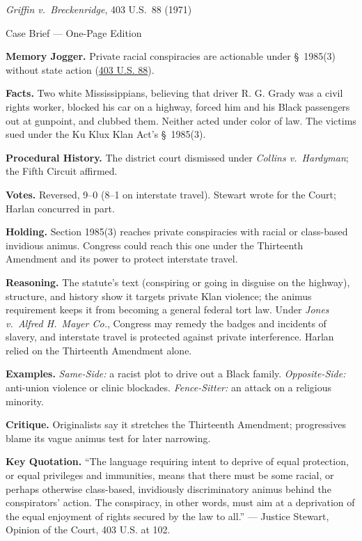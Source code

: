 \documentclass[12pt]{article}
\begin{document}
\begin{center}
{\Large \textit{Griffin v.\ Breckenridge}, 403 U.S.\ 88 (1971)\par}
\vspace{0.3em}
{\normalsize Case Brief --- One-Page Edition\par}
\end{center}

\textbf{Memory Jogger.} Private racial conspiracies are actionable under \S~1985(3) without state action (\href{https://supreme.justia.com/cases/federal/us/403/88/}{403 U.S. 88}).

\textbf{Facts.} Two white Mississippians, believing that driver R. G. Grady was a civil rights worker, blocked his car on a highway, forced him and his Black passengers out at gunpoint, and clubbed them. Neither acted under color of law. The victims sued under the Ku Klux Klan Act's \S~1985(3).

\textbf{Procedural History.} The district court dismissed under \textit{Collins v.\ Hardyman}; the Fifth Circuit affirmed.

\textbf{Votes.} Reversed, 9--0 (8--1 on interstate travel). Stewart wrote for the Court; Harlan concurred in part.

\textbf{Holding.} Section 1985(3) reaches private conspiracies with racial or class-based invidious animus. Congress could reach this one under the Thirteenth Amendment and its power to protect interstate travel.

\textbf{Reasoning.} The statute's text (conspiring or going in disguise on the highway), structure, and history show it targets private Klan violence; the animus requirement keeps it from becoming a general federal tort law. Under \textit{Jones v.\ Alfred H.\ Mayer Co.}, Congress may remedy the badges and incidents of slavery, and interstate travel is protected against private interference. Harlan relied on the Thirteenth Amendment alone.

\textbf{Examples.} \emph{Same-Side:} a racist plot to drive out a Black family. \emph{Opposite-Side:} anti-union violence or clinic blockades. \emph{Fence-Sitter:} an attack on a religious minority.

\textbf{Critique.} Originalists say it stretches the Thirteenth Amendment; progressives blame its vague animus test for later narrowing.

\textbf{Key Quotation.} ``The language requiring intent to deprive of equal protection, or equal privileges and immunities, means that there must be some racial, or perhaps otherwise class-based, invidiously discriminatory animus behind the conspirators' action. The conspiracy, in other words, must aim at a deprivation of the equal enjoyment of rights secured by the law to all.'' --- Justice Stewart, Opinion of the Court, 403 U.S. at 102.
\end{document}
